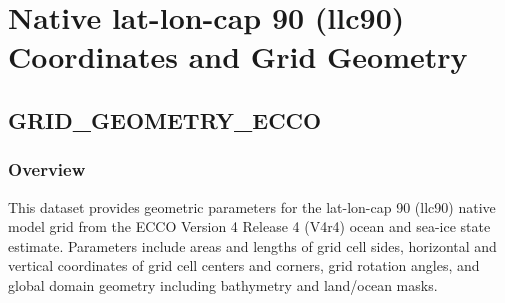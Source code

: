 \section{Native lat-lon-cap 90 (llc90) Coordinates and Grid Geometry}
\subsection{GRID\_GEOMETRY\_ECCO}
\subsubsection{Overview}
\newp
This dataset provides geometric parameters for the lat-lon-cap 90 (llc90) native model grid from the ECCO Version 4 Release 4 (V4r4) ocean and sea-ice state estimate. Parameters include areas and lengths of grid cell sides, horizontal and vertical coordinates of grid cell centers and corners, grid rotation angles, and global domain geometry including bathymetry and land/ocean masks.
\\\\
